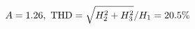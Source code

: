 \documentclass[preview]{standalone}
\begin{document}
\begin{align*}
\special{dvisvgm:raw <g id='unique000'>}A=1.26,\ \text{THD}=\sqrt{H_2^2+H_3^2}/H_1=20.5\%\special{dvisvgm:raw </g>}
\end{align*}
\end{document}

